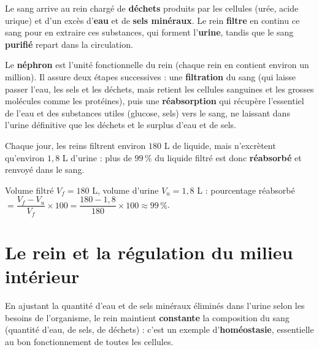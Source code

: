 \begin{propriete}
Le sang arrive au rein chargé de \textbf{déchets} produits par les cellules (urée,
acide urique) et d'un excès d'\textbf{eau} et de \textbf{sels minéraux}. Le rein
\textbf{filtre} en continu ce sang pour en extraire ces substances, qui forment
l'\textbf{urine}, tandis que le sang \textbf{purifié} repart dans la circulation.
\end{propriete}

\begin{definition}[Néphron]
Le \textbf{néphron} est l'unité fonctionnelle du rein (chaque rein en contient environ un
million). Il assure deux étapes successives : une \textbf{filtration} du sang (qui laisse
passer l'eau, les sels et les déchets, mais retient les cellules sanguines et les grosses
molécules comme les protéines), puis une \textbf{réabsorption} qui récupère l'essentiel de
l'eau et des substances utiles (glucose, sels) vers le sang, ne laissant dans l'urine
définitive que les déchets et le surplus d'eau et de sels.
\end{definition}

\begin{propriete}
Chaque jour, les reins filtrent environ $180$ L de liquide, mais n'excrètent qu'environ
$1{,}8$ L d'urine : plus de $99\,\%$ du liquide filtré est donc \textbf{réabsorbé} et
renvoyé dans le sang.
\end{propriete}

\begin{exemple}
Volume filtré $V_f=180$ L, volume d'urine $V_u=1{,}8$ L : pourcentage réabsorbé
$=\dfrac{V_f-V_u}{V_f}\times100=\dfrac{180-1{,}8}{180}\times100\approx99\,\%$.
\end{exemple}

\section{Le rein et la régulation du milieu intérieur}

\begin{propriete}[Homéostasie]
En ajustant la quantité d'eau et de sels minéraux éliminés dans l'urine selon les besoins
de l'organisme, le rein maintient \textbf{constante} la composition du sang (quantité
d'eau, de sels, de déchets) : c'est un exemple d'\textbf{homéostasie}, essentielle au bon
fonctionnement de toutes les cellules.
\end{propriete}

